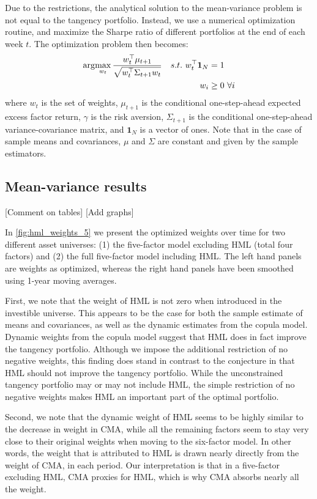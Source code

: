 Due to the restrictions, the analytical solution to the mean-variance problem is not equal to the tangency portfolio. Instead, we use a numerical optimization routine, and maximize the Sharpe ratio of different portfolios at the end of each week $t$. The optimization problem then becomes:
\begin{align}
	\arg\!\max_{w_t} \frac{w_t^\top \mu_{t+1}}{\sqrt{w_t^\top \Sigma_{t+1} w_t}} && s.t.\,\,w_t^\top \mathbf{1}_N &= 1 \\
	&& w_i &\geq 0 \,\, \forall i \notag
\end{align}
where $w_t$ is the set of weights, $\mu_{t+1}$ is the conditional one-step-ahead expected excess factor return, $\gamma$ is the risk aversion, $\Sigma_{t+1}$ is the conditional one-step-ahead variance-covariance matrix, and $\mathbf{1}_N$ is a vector of ones. Note that in the case of sample means and covariances, $\mu$ and $\Sigma$ are constant and given by the sample estimators. 

\subsection{Mean-variance results}
[Comment on tables]
[Add graphs]

In \autoref{fig:hml_weights_5} we present the optimized weights over time for two different asset universes: (1) the five-factor model excluding HML (total four factors) and (2) the full five-factor model including HML. The left hand panels are weights as optimized, whereas the right hand panels have been smoothed using 1-year moving averages.

First, we note that the weight of HML is not zero when introduced in the investible universe. This appears to be the case for both the sample estimate of means and covariances, as well as the dynamic estimates from the copula model. Dynamic weights from the copula model suggest that HML does in fact improve the tangency portfolio. Although we impose the additional restriction of no negative weights, this finding does stand in contrast to the conjecture in \textcite{FF2015} that HML should not improve the tangency portfolio. While the unconstrained tangency portfolio may or may not include HML, the simple restriction of no negative weights makes HML an important part of the optimal portfolio.

Second, we note that the dynamic weight of HML seems to be highly similar to the decrease in weight in CMA, while all the remaining factors seem to stay very close to their original weights when moving to the six-factor model. In other words, the weight that is attributed to HML is drawn nearly directly from the weight of CMA, in each period. Our interpretation is that in a five-factor excluding HML, CMA proxies for HML, which is why CMA absorbs nearly all the weight.

